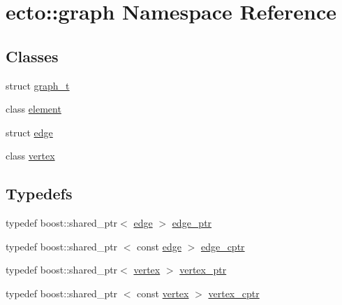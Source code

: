 \hypertarget{namespaceecto_1_1graph}{\section{ecto\-:\-:graph \-Namespace \-Reference}
\label{namespaceecto_1_1graph}
}
\subsection*{\-Classes}
\begin{DoxyCompactItemize}
\item 
struct \hyperlink{structecto_1_1graph_1_1graph__t}{graph\-\_\-t}
\item 
class \hyperlink{classecto_1_1graph_1_1element}{element}
\item 
struct \hyperlink{structecto_1_1graph_1_1edge}{edge}
\item 
class \hyperlink{classecto_1_1graph_1_1vertex}{vertex}
\end{DoxyCompactItemize}
\subsection*{\-Typedefs}
\begin{DoxyCompactItemize}
\item 
typedef boost\-::shared\-\_\-ptr$<$ \hyperlink{structecto_1_1graph_1_1edge}{edge} $>$ \hyperlink{namespaceecto_1_1graph_ad6da390ef18395607e6eab139f37fcf4}{edge\-\_\-ptr}
\item 
typedef boost\-::shared\-\_\-ptr\*
$<$ const \hyperlink{structecto_1_1graph_1_1edge}{edge} $>$ \hyperlink{namespaceecto_1_1graph_ac45fa43674f9071675a1ebbf4d021eb4}{edge\-\_\-cptr}
\item 
typedef boost\-::shared\-\_\-ptr$<$ \hyperlink{classecto_1_1graph_1_1vertex}{vertex} $>$ \hyperlink{namespaceecto_1_1graph_a878e413dd7cdb7395b02f5be20e12b51}{vertex\-\_\-ptr}
\item 
typedef boost\-::shared\-\_\-ptr\*
$<$ const \hyperlink{classecto_1_1graph_1_1vertex}{vertex} $>$ \hyperlink{namespaceecto_1_1graph_ab1ad7248e81caff384fed98d61fca8ca}{vertex\-\_\-cptr}
\end{DoxyCompactItemize}


